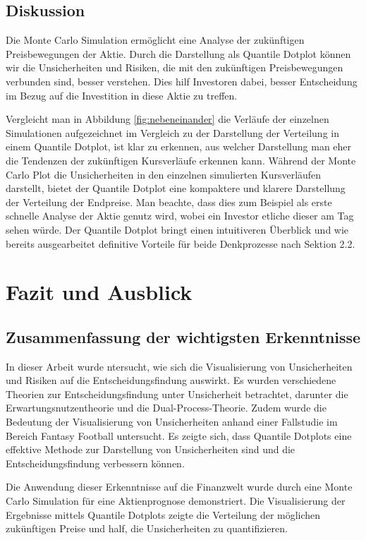 \subsection{Diskussion}
Die Monte Carlo Simulation ermöglicht eine Analyse der zukünftigen Preisbewegungen der Aktie. Durch die Darstellung als Quantile Dotplot können wir die Unsicherheiten und Risiken, die mit den zukünftigen Preisbewegungen verbunden sind, besser verstehen. Dies hilf Investoren dabei, besser Entscheidung im Bezug auf die Investition in diese Aktie zu treffen.

Vergleicht man in Abbildung \ref{fig:nebeneinander} die Verläufe der einzelnen Simulationen aufgezeichnet im Vergleich zu der Darstellung der Verteilung in einem Quantile Dotplot, ist klar zu erkennen, aus welcher Darstellung man eher die Tendenzen der zukünftigen Kursverläufe erkennen kann. Während der Monte Carlo Plot die Unsicherheiten in den einzelnen simulierten Kursverläufen darstellt, bietet der Quantile Dotplot eine kompaktere und klarere Darstellung der Verteilung der Endpreise. Man beachte, dass dies zum Beispiel als erste schnelle Analyse der Aktie genutz wird, wobei ein Investor etliche dieser am Tag sehen würde.
Der Quantile Dotplot bringt einen intuitiveren Überblick und wie bereits ausgearbeitet definitive Vorteile für beide Denkprozesse nach Sektion 2.2.

\section{Fazit und Ausblick}

\subsection{Zusammenfassung der wichtigsten Erkenntnisse}

In dieser Arbeit wurde ntersucht, wie sich die Visualisierung von Unsicherheiten und Risiken auf die Entscheidungsfindung auswirkt. Es wurden verschiedene Theorien zur Entscheidungsfindung unter Unsicherheit betrachtet, darunter die Erwartungsnutzentheorie und die Dual-Process-Theorie. Zudem wurde die Bedeutung der Visualisierung von Unsicherheiten anhand einer Fallstudie im Bereich Fantasy Football untersucht. Es zeigte sich, dass Quantile Dotplots eine effektive Methode zur Darstellung von Unsicherheiten sind und die Entscheidungsfindung verbessern können.

Die Anwendung dieser Erkenntnisse auf die Finanzwelt wurde durch eine Monte Carlo Simulation für eine Aktienprognose demonstriert. Die Visualisierung der Ergebnisse mittels Quantile Dotplots zeigte die Verteilung der möglichen zukünftigen Preise und half, die Unsicherheiten zu quantifizieren.

